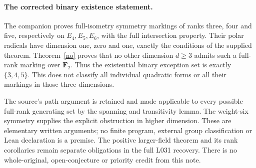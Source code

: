 \documentclass[11pt,a4paper]{article}
\begin{document}
\paragraph{The corrected binary existence statement.}
The companion proves full-isometry symmetry markings of ranks
three, four and five, respectively on $E_4,E_5,E_6$, with the full
intersection property. Their polar radicals have dimension one,
zero and one, exactly the conditions of the supplied theorem.
Theorem~\ref{no} proves that no other dimension $d\geq3$ admits
such a full-rank marking over $\mathbf F_2$. Thus the existential
binary exception set is exactly $\{3,4,5\}$. This does not classify
all individual quadratic forms or all their markings in those
three dimensions.

The source's path argument is retained and made applicable to every
possible full-rank generating set by the spanning and transitivity
lemma. The weight-six symmetry supplies the explicit obstruction
in higher dimension. These are elementary written arguments; no
finite program, external group classification or Lean declaration is
a premise. The positive larger-field theorem and its rank corollaries
remain separate obligations in the full L031 recovery. There is no
whole-original, open-conjecture or priority credit from this note.
\end{document}
